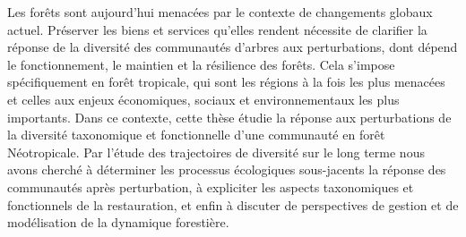 \documentclass[
  11pt,
  french,
  A4paper,
  extrafontsizes,onecolumn,openright
  ]{memoir}
\begin{document}

\backmatter
\SmallMargins

%
\printbibliography










\evenpage
\SmallMargins
\thispagestyle{empty}

\begin{normalsize}

\begin{description}

\item[Résumé:]
Les forêts sont aujourd'hui menacées par le contexte de changements
globaux actuel. Préserver les biens et services qu'elles rendent
nécessite de clarifier la réponse de la diversité des communautés
d'arbres aux perturbations, dont dépend le fonctionnement, le maintien
et la résilience des forêts. Cela s'impose spécifiquement en forêt
tropicale, qui sont les régions à la fois les plus menacées et celles
aux enjeux économiques, sociaux et environnementaux les plus importants.
Dans ce contexte, cette thèse étudie la réponse aux perturbations de la
diversité taxonomique et fonctionnelle d'une communauté en forêt
Néotropicale. Par l'étude des trajectoires de diversité sur le long
terme nous avons cherché à déterminer les processus écologiques
sous-jacents la réponse des communautés après perturbation, à expliciter
les aspects taxonomiques et fonctionnels de la restauration, et enfin à
discuter de perspectives de gestion et de modélisation de la dynamique
forestière.


\end{description}
\end{normalsize}
\end{document}
